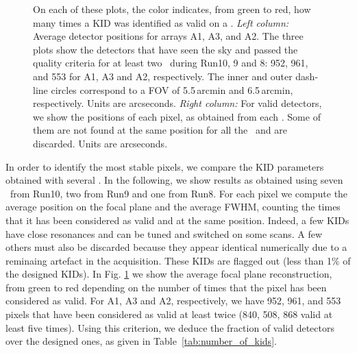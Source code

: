 \begin{figure}[p]
\begin{center}
\caption[KID selection and stability of position in the FOV]{On each of these
  plots, the color indicates, from green to red, how many times a KID was
  identified as valid on a \bm. \emph{Left column:} Average detector positions
  for arrays A1, A3, and A2. The three plots show the detectors that have seen
  the sky and passed the quality criteria for at least two \bms\ during Run10, 9
  and 8: 952, 961, and 553 for A1, A3 and A2, respectively. The inner and outer
  dash-line circles correspond to a FOV of 5.5\,arcmin and 6.5\,arcmin,
  respectively. Units are arcseconds. \emph{Right column:} For valid detectors,
  we show the positions of each pixel, as obtained from each \bm. Some of them
  are not found at the same position for all the \bms\ and are discarded. Units
  are arcseconds.}
\label{fig:avg_fov_color}
\end{center}
\end{figure}

In order to identify the most stable pixels, we compare the KID parameters
obtained with several \bms.  In the following, we show results as obtained using
seven \bms\ from Run10, two from Run9 and one from Run8.  For each pixel we
compute the average position on the focal plane and the average FWHM, counting
the times that it has been considered as valid and at the same position. Indeed,
a few KIDs have close resonances and can be tuned and switched on some scans. A
few others must also be discarded because they appear identical numerically due
to a reminaing artefact in the acquisition. These KIDs are flagged out (less
than 1\% of the designed KIDs). In Fig. \ref{fig:avg_fov_color} we show the
average focal plane reconstruction, from green to red depending on the number of
times that the pixel has been considered as valid. For A1, A3 and A2,
respectively, we have 952, 961, and 553 pixels that have been considered as
valid at least twice (840, 508, 868 valid at least five times). Using this
criterion, we deduce the fraction of valid detectors over the designed ones, as
given in Table~\ref{tab:number_of_kids}.



